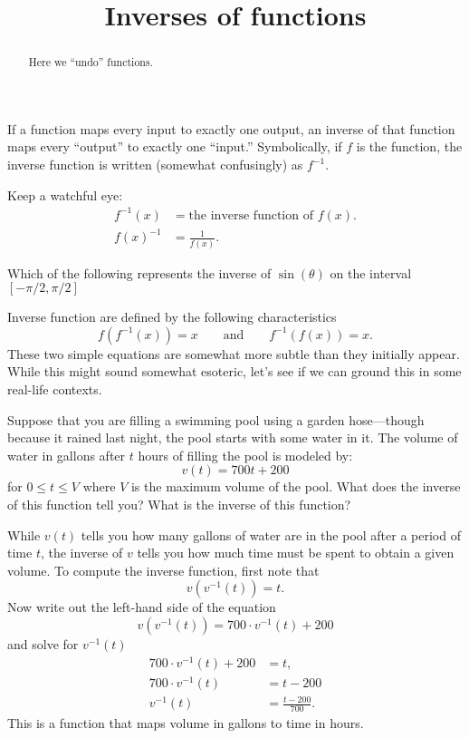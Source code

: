 \documentclass{ximera}
\title{Inverses of functions}
\begin{document}
\begin{abstract}
  Here we ``undo'' functions.
\end{abstract}
\maketitle

If a function maps every input to exactly one output, an inverse of
that function maps every ``output'' to exactly one ``input.''
Symbolically, if $f$ is the function, the inverse function is written
(somewhat confusingly) as $f^{-1}$.

\begin{warning}
  Keep a watchful eye:
  \begin{align*}
    f^{-1}(x) &= \text{the inverse function of $f(x)$.}\\
    f(x)^{-1} &= \text{$\frac{1}{f(x)}$.}
  \end{align*}
\end{warning}
\begin{question}
  Which of the following represents the inverse of $\sin(\theta)$ on the
  interval $[-\pi/2,\pi/2]$
  \begin{multipleChoice}
  \end{multipleChoice}
\end{question}
Inverse function are defined by the following characteristics
\[
f(f^{-1}(x)) = x\qquad\text{and}\qquad f^{-1}(f(x)) = x.
\]
These two simple equations are somewhat more subtle than they
initially appear.  While this might sound somewhat esoteric, let's see
if we can ground this in some real-life contexts.

\begin{example}
Suppose that you are filling a swimming pool using a garden
hose---though because it rained last night, the pool starts with some
water in it. The volume of water in gallons after $t$ hours of filling
the pool is modeled by:
\[
v(t) = 700t + 200 
\]
for $0\le t \le V$ where $V$ is the maximum volume of the pool. What
does the inverse of this function tell you? What is the inverse of
this function?
\begin{explanation}
While $v(t)$ tells you how many gallons of water are in the pool after
a period of time $t$, the inverse of $v$ tells you how much time must
be spent to obtain a given volume. To compute the inverse function,
first note that
\[
v(v^{-1}(t)) = t.
\]
Now write out the left-hand side of the equation
\[
v(v^{-1}(t)) = 700\cdot v^{-1}(t) + 200 
\]
and solve for $v^{-1}(t)$
\begin{align*}
  700\cdot v^{-1}(t) + 200 &= t,\\
  700\cdot v^{-1}(t)  &= t-200\\
  v^{-1}(t) &= \frac{t-200}{700}.
\end{align*}
This is a function that maps volume in gallons to time in hours. 
\end{explanation}
\end{example}
\end{document}
